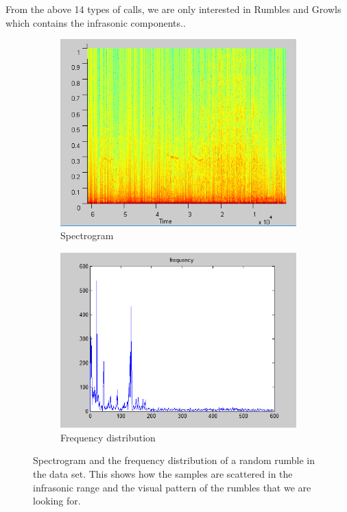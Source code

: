 \documentclass[12pt]{article}
\numberwithin{figure}{section}
\numberwithin{table}{section}
\begin{document}
From the above 14 types of calls, we are only interested in Rumbles and Growls which contains the infrasonic components.\cite{42}.


\begin{figure}[H]
\centering
\begin{subfigure}{.5\textwidth}
  \centering
  \includegraphics[width=.8\linewidth]{rumble_spectro.png}
  \caption{Spectrogram}
  \label{rumble_spectro}
\end{subfigure}%
\begin{subfigure}{.5\textwidth}
  \centering
  \includegraphics[width=.8\linewidth]{rumble_sfft.png}
  \caption{Frequency distribution}
  \label{fig:sub2}
\end{subfigure}
\caption[Spectrogram and the frequency distribution of a random rumble in the data set.]{Spectrogram and the frequency distribution of a random rumble in the data set. This shows how the samples are scattered in the infrasonic range and the visual pattern of the rumbles that we are looking for.}
\label{spectro:fft}
\end{figure} 
\end{document}

